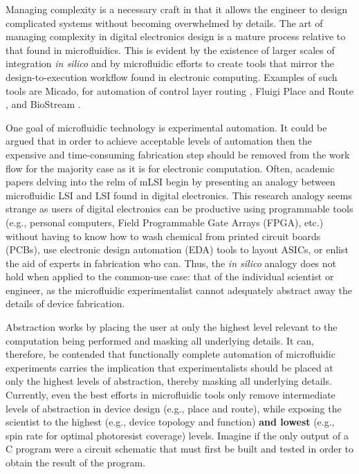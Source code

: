 Managing complexity is a necessary craft in that it allows the engineer to design complicated systems without becoming overwhelmed by details. The art of managing complexity in digital electronics design is  a mature process relative to that found in microfluidics. This is evident by the existence of larger scales of integration \emph{in silico} and by microfluidic efforts to create tools that mirror the design-to-execution workflow found in electronic computing. Examples of such tools are Micado, for automation of control layer routing \cite{amin2009}, Fluigi Place and Route \cite{fluigi}, and BioStream \cite{thies2008}. 

One goal of microfluidic technology is experimental automation. It could be argued that in order to achieve acceptable levels of automation then the expensive and time-consuming fabrication step should be removed from the work flow for the majority case as it is for electronic computation. Often, academic papers delving into the relm of mLSI begin by presenting an analogy between microfluidic LSI and LSI found in digital electronics. This research analogy seems strange as users of digital electronics can be productive using programmable tools (e.g., personal computers, Field Programmable Gate Arrays (FPGA), etc.) without having to know how to wash chemical from printed circuit boards (PCBs), use electronic design automation (EDA) tools to layout ASICs, or enlist the aid of experts in fabrication who can. Thus, the \emph{in silico} analogy does not hold when applied to the common-use case: that of the individual scientist or engineer, as the microfluidic experimentalist cannot adequately abstract away the details of device fabrication.

Abstraction works by placing the user at only the highest level relevant to the computation being performed and masking all underlying details. It can, therefore, be contended that functionally complete automation of microfluidic experiments carries the implication that experimentalists should be placed at only the highest levels of abstraction, thereby masking all underlying details. Currently, even the best efforts in microfluidic tools only remove intermediate levels of abstraction in device design (e.g., place and route), while exposing the scientist to the highest (e.g., device topology and function) \textbf{and lowest} (e.g., spin rate for optimal photoresist coverage) levels. Imagine if the only output of a C program were a circuit schematic that must first be built and tested in order to obtain the result of the program. 

